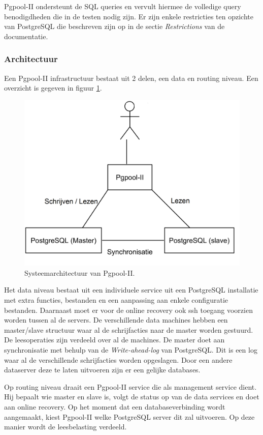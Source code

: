 Pgpool-II ondersteunt de SQL queries en vervult hiermee de volledige query benodigdheden die in de testen nodig zijn. Er zijn enkele restricties ten opzichte van PostgreSQL die beschreven zijn op in de sectie \textit{Restrictions} van de documentatie\cite{pgpool-doc}. 

\subsubsection{Architectuur}
Een Pgpool-II infrastructuur bestaat uit 2 delen, een data en routing niveau. Een overzicht is gegeven in figuur \ref{fig:Pgpool-structure}. 

\begin{figure}[ht!]
\centering
\includegraphics[width=0.5\linewidth]{img/Pgpool-structuur}
\caption{Systeemarchitectuur van Pgpool-II.}
\label{fig:Pgpool-structure}
\end{figure}

Het data niveau bestaat uit een individuele service uit een PostgreSQL installatie met extra functies, bestanden en een aanpassing aan enkele configuratie bestanden. Daarnaast moet er voor de online recovery ook ssh toegang voorzien worden tussen al de servers. De verschillende data machines hebben een master/slave structuur waar al de schrijfacties naar de master worden gestuurd. De leesoperaties zijn verdeeld over al de machines. De master doet aan synchronisatie met behulp van de \textit{Write-ahead-log} van PostgreSQL. Dit is een log waar al de verschillende schrijfacties worden opgeslagen. Door een andere dataserver deze te laten uitvoeren zijn er een gelijke databases. 

Op routing niveau draait een Pgpool-II service die als management service dient. Hij bepaalt wie master en slave is, volgt de status op van de data services en doet aan online recovery. Op het moment dat een databaseverbinding wordt aangemaakt, kiest Pgpool-II welke PostgreSQL server dit zal uitvoeren. Op deze manier wordt de leesbelasting verdeeld. 

